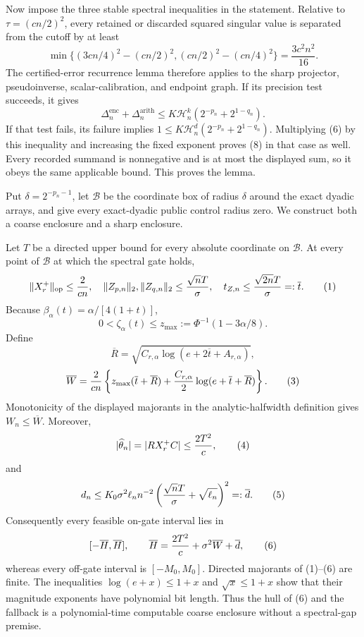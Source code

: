 Now impose the three stable spectral inequalities in the statement.  Relative
to \(\tau=(cn/2)^2\), every retained or discarded squared singular value is
separated from the cutoff by at least
\[
\min\{(3cn/4)^2-(cn/2)^2,(cn/2)^2-(cn/4)^2\}
=\frac{3c^2n^2}{16}.                                                   \tag{7}
\]
The certified-error recurrence lemma therefore applies to the sharp projector,
pseudoinverse, scalar-calibration, and endpoint graph.  If its precision test
succeeds, it gives
\[
\Delta_n^{\mathrm{enc}}+\Delta_n^{\mathrm{arith}}
\le K\mathcal H_n^k(2^{-p_n}+2^{1-q_n}).                              \tag{8}
\]
If that test fails, its failure implies
\(1\le K\mathcal H_n^d(2^{-p_n}+2^{1-q_n})\).  Multiplying (6) by this
inequality and increasing the fixed exponent proves (8) in that case as well.
Every recorded summand is nonnegative and is at most the displayed sum, so it
obeys the same applicable bound.  This proves the lemma.

Put \(\delta=2^{-p_n-1}\), let \(\mathcal B\) be the coordinate box of radius
\(\delta\) around the exact dyadic arrays, and give every exact-dyadic public
control radius zero.  We construct both a coarse enclosure and a sharp
enclosure.

Let \(T\) be a directed upper bound for every absolute coordinate on
\(\mathcal B\).  At every point of \(\mathcal B\) at which the spectral gate
holds,
\[
\|X_r^+\|_{
\mathrm{op}}\le {2\over cn},
\quad
\|Z_{p,n}\|_2,\|Z_{q,n}\|_2\le {\sqrt nT\over\sigma},
\quad
t_{Z,n}\le {\sqrt{2n}T\over\sigma}=:\overline t.                    \tag{1}
\]
Because \(\beta_\alpha(t)=\alpha/[4(1+t)]\),
\[
0<\zeta_\alpha(t)\le z_{
\max}:=\Phi^{-1}(1-3\alpha/8).                                       \tag{2}
\]
Define
\[
\overline R=\sqrt{C_{r,\alpha}\log(e+2\overline t+A_{r,\alpha})},
\]
\[
\overline W={2\over cn}
\left\{z_{
\max}(\overline t+\overline R)
+{C_{r,\alpha}\over2}\log(e+\overline t+\overline R)\right\}.      \tag{3}
\]
Monotonicity of the displayed majorants in the analytic-halfwidth definition
gives \(W_n\le\overline W\).  Moreover,
\[
|\widehat\theta_n|=|RX_r^+C|\le {2T^2\over c},                       \tag{4}
\]
and
\[
d_n\le K_0\sigma^2\ell_n n^{-2}
\left({\sqrt nT\over\sigma}+\sqrt{\ell_n}\right)^2=:\overline d.   \tag{5}
\]
Consequently every feasible on-gate interval lies in
\[
[-\overline H,\overline H],\qquad
\overline H={2T^2\over c}+\sigma^2\overline W+\overline d,           \tag{6}
\]
whereas every off-gate interval is \([-M_0,M_0]\).  Directed majorants of
(1)--(6) are finite.  The inequalities \(\log(e+x)\le1+x\) and
\(\sqrt x\le1+x\) show that their magnitude exponents have polynomial bit
length.  Thus the hull of (6) and the fallback is a polynomial-time computable
coarse enclosure without a spectral-gap premise.

